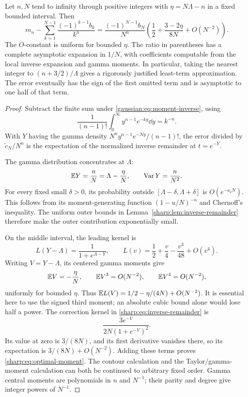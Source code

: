 \begin{theorem}\label{sharp:thm:optimal-moment}
Let \(n,N\) tend to infinity through positive integers with
\(\eta=N\Lambda-n\) in a fixed bounded interval. Then
\begin{equation}\label{sharp:eq:optimal-moment}
 \boxed{\displaystyle
 m_n-\sum_{k=1}^{N-1}\frac{(-1)^{k-1}b_k}{k^n}
 =\frac{(-1)^{N-1}b_N}{N^n}
 \left(\frac12+\frac{3-2\eta}{8N}+O(N^{-2})\right).}
\end{equation}
The \(O\)-constant is uniform for bounded \(\eta\).
The ratio in parentheses has a complete asymptotic expansion in
\(1/N\), with coefficients computable from the local inverse expansion
and gamma moments.
In particular, taking the nearest integer to \((n+3/2)/\Lambda\)
gives a rigorously justified least-term approximation. The error
eventually has the sign of the first omitted term and is asymptotic
to one half of that term.
\end{theorem}

\begin{proof}
Subtract the finite sum under \eqref{gaussian:eq:moment-inverse}, using
\[
 \frac1{(n-1)!}\int_0^\infty y^{n-1}e^{-ky}\dd y=k^{-n}.
\]
With \(Y\) having the gamma density
\(N^ny^{n-1}e^{-Ny}/(n-1)!\), the error divided by \(\widetilde c_N/N^n\) is
the expectation of the normalized inverse remainder at \(t=e^{-Y}\).

The gamma distribution concentrates at \(\Lambda\):
\[
 \mathbb E Y=\frac nN=\Lambda-\frac\eta N,\qquad
 \operatorname{Var}Y=\frac n{N^2}.
\]
For every fixed small \(\delta>0\), its probability outside
\([\Lambda-\delta,\Lambda+\delta]\) is \(O(e^{-a_\delta N})\).
This follows from its moment-generating function
\((1-u/N)^{-n}\) and Chernoff's inequality.
The uniform outer bounds in Lemma~\ref{sharp:lem:inverse-remainder}
therefore make the outer contribution exponentially small.

On the middle interval, the leading kernel is
\[
 L(Y-\Lambda)=\frac1{1+e^{\Lambda-Y}},\qquad
 L(v)=\frac12+\frac v4-\frac{v^3}{48}+O(v^4).
\]
Writing \(V=Y-\Lambda\), its centered gamma moments give
\[
 \mathbb E V=-\frac\eta N,\qquad
 \mathbb E V^3=O(N^{-2}),\qquad \mathbb E V^4=O(N^{-2}),
\]
uniformly for bounded \(\eta\). Thus
\(\mathbb E L(V)=1/2-\eta/(4N)+O(N^{-2})\).
It is essential here to use the signed third moment; an absolute
cubic bound alone would lose half a power.
The correction kernel in \eqref{sharp:eq:inverse-remainder} is
\[
 \frac{3e^{-V}}{2N(1+e^{-V})^2}.
\]
Its value at zero is \(3/(8N)\), and its first derivative vanishes
there, so its expectation is \(3/(8N)+O(N^{-2})\).
Adding these terms proves \eqref{sharp:eq:optimal-moment}.
The contour calculation and the Taylor/gamma-moment calculation can
both be continued to arbitrary fixed order. Gamma central moments
are polynomials in \(n\) and \(N^{-1}\); their parity and degree give
integer powers of \(N^{-1}\).
\end{proof}

